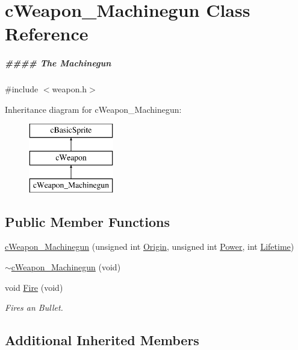 \hypertarget{classc_weapon___machinegun}{\section{c\-Weapon\-\_\-\-Machinegun Class Reference}
\label{classc_weapon___machinegun}
}


\subparagraph*{\#\#\#\# The Machinegun} 




{\ttfamily \#include $<$weapon.\-h$>$}

Inheritance diagram for c\-Weapon\-\_\-\-Machinegun\-:\begin{figure}[H]
\begin{center}
\leavevmode
\includegraphics[height=3.000000cm]{classc_weapon___machinegun}
\end{center}
\end{figure}
\subsection*{Public Member Functions}
\begin{DoxyCompactItemize}
\item 
\hyperlink{classc_weapon___machinegun_a2a3561ff6416d7becdbf0535d2d5ef81}{c\-Weapon\-\_\-\-Machinegun} (unsigned int \hyperlink{classc_weapon_a2a521dd1a2aa10d5f6c0b45c09932519}{Origin}, unsigned int \hyperlink{classc_weapon_aa33960894f9ca703e3b3ad6a9f7f3f67}{Power}, int \hyperlink{classc_weapon_a7bc9a58e30a80556ba83e32067657b74}{Lifetime})
\item 
\hyperlink{classc_weapon___machinegun_aedee20481bd963e803970b657329de57}{$\sim$c\-Weapon\-\_\-\-Machinegun} (void)
\item 
void \hyperlink{classc_weapon___machinegun_ad0455412b53fd76dcbd768041765a424}{Fire} (void)
\begin{DoxyCompactList}\small\item\em Fires an Bullet. \end{DoxyCompactList}\end{DoxyCompactItemize}
\subsection*{Additional Inherited Members}


